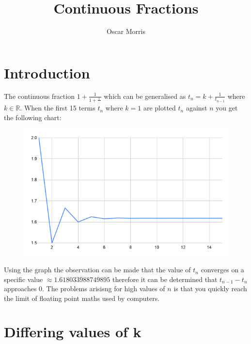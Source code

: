 \documentclass[11pt]{article}
\author{Oscar Morris}
\date{}
\title{Continuous Fractions}
\begin{document}
\maketitle
\tableofcontents


\section{Introduction}
\label{sec:orgd1732b9}
The continuous fraction \(1+\frac{1}{1+\frac{1}{\dots}}\) which can be generalised as \(t_n=k+\frac{1}{t_{n-1}}\) where \(k \in \mathds{R}\). When the first 15 terms \(t_n\) where \(k=1\) are plotted \(t_n\) against \(n\) you get the following chart:
\begin{figure}[h]
\includegraphics[scale=0.5]{chart1}
\end{figure}
Using the graph the observation can be made that the value of \(t_n\) converges on a specific value \(\approx 1.618033988749895\) therefore it can be determined that \(t_{n-1}-t_n\) approaches \(0\). The problems arisisng for high values of \(n\) is that you quickly reach the limit of floating point maths used by computers.
\section{Differing values of k}
\label{sec:org7584de5}
\end{document}
